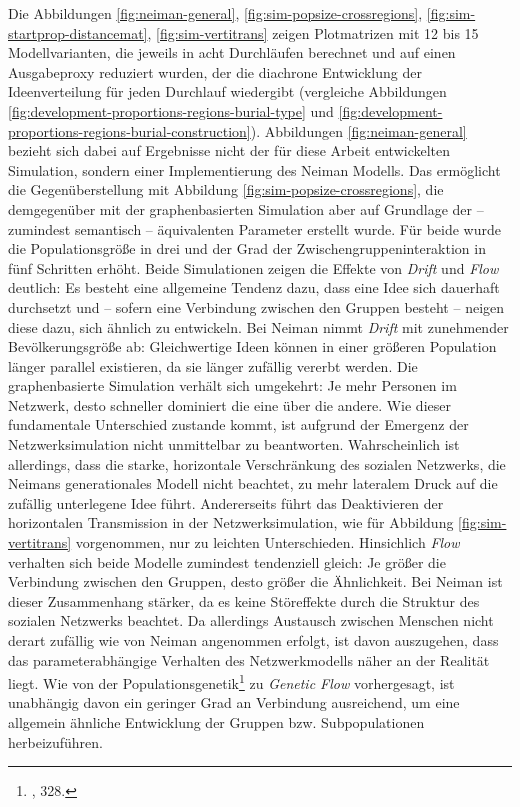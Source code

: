 \documentclass[openany,twoside,twocolumn]{book}
\let\rmarkdownfootnote\footnote%
\def\footnote{\protect\rmarkdownfootnote}
\begin{document}
Die Abbildungen \ref{fig:neiman-general},
\ref{fig:sim-popsize-crossregions}, \ref{fig:sim-startprop-distancemat},
\ref{fig:sim-vertitrans} zeigen Plotmatrizen mit 12 bis 15
Modellvarianten, die jeweils in acht Durchläufen berechnet und auf einen
Ausgabeproxy reduziert wurden, der die diachrone Entwicklung der
Ideenverteilung für jeden Durchlauf wiedergibt (vergleiche Abbildungen
\ref{fig:development-proportions-regions-burial-type} und
\ref{fig:development-proportions-regions-burial-construction}).
Abbildungen \ref{fig:neiman-general} bezieht sich dabei auf Ergebnisse
nicht der für diese Arbeit entwickelten Simulation, sondern einer
Implementierung des Neiman Modells. Das ermöglicht die Gegenüberstellung
mit Abbildung \ref{fig:sim-popsize-crossregions}, die demgegenüber mit
der graphenbasierten Simulation aber auf Grundlage der -- zumindest
semantisch -- äquivalenten Parameter erstellt wurde. Für beide wurde die
Populationsgröße in drei und der Grad der Zwischengruppeninteraktion in
fünf Schritten erhöht. Beide Simulationen zeigen die Effekte von
\emph{Drift} und \emph{Flow} deutlich: Es besteht eine allgemeine
Tendenz dazu, dass eine Idee sich dauerhaft durchsetzt und -- sofern
eine Verbindung zwischen den Gruppen besteht -- neigen diese dazu, sich
ähnlich zu entwickeln. Bei Neiman nimmt \emph{Drift} mit zunehmender
Bevölkerungsgröße ab: Gleichwertige Ideen können in einer größeren
Population länger parallel existieren, da sie länger zufällig vererbt
werden. Die graphenbasierte Simulation verhält sich umgekehrt: Je mehr
Personen im Netzwerk, desto schneller dominiert die eine über die
andere. Wie dieser fundamentale Unterschied zustande kommt, ist aufgrund
der Emergenz der Netzwerksimulation nicht unmittelbar zu beantworten.
Wahrscheinlich ist allerdings, dass die starke, horizontale
Verschränkung des sozialen Netzwerks, die Neimans generationales Modell
nicht beachtet, zu mehr lateralem Druck auf die zufällig unterlegene
Idee führt. Andererseits führt das Deaktivieren der horizontalen
Transmission in der Netzwerksimulation, wie für Abbildung
\ref{fig:sim-vertitrans} vorgenommen, nur zu leichten Unterschieden.
Hinsichlich \emph{Flow} verhalten sich beide Modelle zumindest
tendenziell gleich: Je größer die Verbindung zwischen den Gruppen, desto
größer die Ähnlichkeit. Bei Neiman ist dieser Zusammenhang stärker, da
es keine Störeffekte durch die Struktur des sozialen Netzwerks beachtet.
Da allerdings Austausch zwischen Menschen nicht derart zufällig wie von
Neiman angenommen erfolgt, ist davon auszugehen, dass das
parameterabhängige Verhalten des Netzwerkmodells näher an der Realität
liegt. Wie von der Populationsgenetik\footnote{\textcite{frankham_introduction_2002},
  328.} zu \emph{Genetic Flow} vorhergesagt, ist unabhängig davon ein
geringer Grad an Verbindung ausreichend, um eine allgemein ähnliche
Entwicklung der Gruppen bzw. Subpopulationen herbeizuführen.
\end{document}
